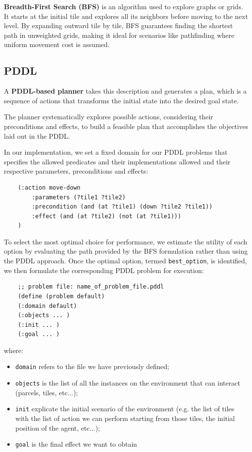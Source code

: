 \documentclass[12pt]{article}
\begin{document}
\textbf{Breadth-First Search (BFS)} is an algorithm used to explore graphs or grids. It starts at the initial tile and explores all its neighbors before moving to the next level. By expanding outward tile by tile, BFS guarantees finding the shortest path in unweighted grids, making it ideal for scenarios like pathfinding where uniform movement cost is assumed.

\subsection{PDDL}

A \textbf{PDDL-based planner} takes this description and generates a plan, which is a sequence of actions that transforms the initial state into the desired goal state. 

The planner systematically explores possible actions, considering their preconditions and effects, to build a feasible plan that accomplishes the objectives laid out in the PDDL.

In our implementation, we set a fixed domain for our PDDL problems that specifies the allowed predicates and their implementations allowed and their respective parameters, preconditions and effects:

\begin{verbatim}
    (:action move-down
        :parameters (?tile1 ?tile2)
        :precondition (and (at ?tile1) (down ?tile2 ?tile1))
        :effect (and (at ?tile2) (not (at ?tile1)))
    )
\end{verbatim}

To select the most optimal choice for performance, we estimate the utility of each option by evaluating the path provided by the BFS formulation rather than using the PDDL approach. Once the optimal option, termed \texttt{best\_option}, is identified, we then formulate the corresponding PDDL problem for execution:

\begin{verbatim}
    ;; problem file: name_of_problem_file.pddl
    (define (problem default)
    (:domain default)
    (:objects ... )
    (:init ... )
    (:goal ... ) 
\end{verbatim}

where:

\begin{itemize}
    \item \texttt{domain} refers to the file we have previously defined;
    \item  \texttt{objects} is the list of all the instances on the environment that can interact (parcels, tiles, etc...);
    \item \texttt{init} explicate the initial scenario of the environment (e.g. the list of tiles with the list of action we can perform starting from those tiles, the initial position of the agent, etc...);
    \item \texttt{goal} is the final effect we want to obtain 
\end{itemize}
\end{document}
